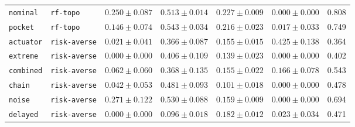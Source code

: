 \documentclass{article}
\begin{document}
\begin{center}
\begin{tabular}{llccccc}
\texttt{nominal} & \texttt{rf-topo} & $0.250 \pm 0.087$ & $0.513 \pm 0.014$ & $0.227 \pm 0.009$ & $0.000 \pm 0.000$ & 0.808 \\
\texttt{pocket} & \texttt{rf-topo} & $0.146 \pm 0.074$ & $0.543 \pm 0.034$ & $0.216 \pm 0.023$ & $0.017 \pm 0.033$ & 0.749 \\
\texttt{actuator} & \texttt{risk-averse} & $0.021 \pm 0.041$ & $0.366 \pm 0.087$ & $0.155 \pm 0.015$ & $0.425 \pm 0.138$ & 0.364 \\
\texttt{extreme} & \texttt{risk-averse} & $0.000 \pm 0.000$ & $0.406 \pm 0.109$ & $0.139 \pm 0.023$ & $0.000 \pm 0.000$ & 0.402 \\
\texttt{combined} & \texttt{risk-averse} & $0.062 \pm 0.060$ & $0.368 \pm 0.135$ & $0.155 \pm 0.022$ & $0.166 \pm 0.078$ & 0.543 \\
\texttt{chain} & \texttt{risk-averse} & $0.042 \pm 0.053$ & $0.481 \pm 0.093$ & $0.101 \pm 0.018$ & $0.000 \pm 0.000$ & 0.478 \\
\texttt{noise} & \texttt{risk-averse} & $0.271 \pm 0.122$ & $0.530 \pm 0.088$ & $0.159 \pm 0.009$ & $0.000 \pm 0.000$ & 0.694 \\
\texttt{delayed} & \texttt{risk-averse} & $0.000 \pm 0.000$ & $0.096 \pm 0.018$ & $0.182 \pm 0.012$ & $0.023 \pm 0.034$ & 0.471 \\
\bottomrule
\end{tabular}
\end{center}
\end{document}
